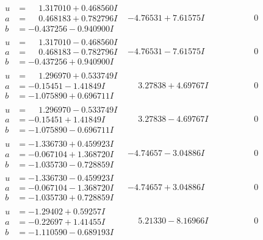 \documentclass[1p]{elsarticle_modified}
\theoremstyle{definition}
\begin{document}
$$\begin{array}{c|c|c}
\begin{aligned}
u &= \phantom{-}1.317010 + 0.468560 I \\
a &= \phantom{-}0.468183 + 0.782796 I \\
b &= -0.437256 - 0.940900 I\end{aligned}
 & -4.76531 + 7.61575 I & \phantom{-0.000000 } 0 \\ \hline\begin{aligned}
u &= \phantom{-}1.317010 - 0.468560 I \\
a &= \phantom{-}0.468183 - 0.782796 I \\
b &= -0.437256 + 0.940900 I\end{aligned}
 & -4.76531 - 7.61575 I & \phantom{-0.000000 } 0 \\ \hline\begin{aligned}
u &= \phantom{-}1.296970 + 0.533749 I \\
a &= -0.15451 - 1.41849 I \\
b &= -1.075890 + 0.696711 I\end{aligned}
 & \phantom{-}3.27838 + 4.69767 I & \phantom{-0.000000 } 0 \\ \hline\begin{aligned}
u &= \phantom{-}1.296970 - 0.533749 I \\
a &= -0.15451 + 1.41849 I \\
b &= -1.075890 - 0.696711 I\end{aligned}
 & \phantom{-}3.27838 - 4.69767 I & \phantom{-0.000000 } 0 \\ \hline\begin{aligned}
u &= -1.336730 + 0.459923 I \\
a &= -0.067104 + 1.368720 I \\
b &= -1.035730 - 0.728859 I\end{aligned}
 & -4.74657 - 3.04886 I & \phantom{-0.000000 } 0 \\ \hline\begin{aligned}
u &= -1.336730 - 0.459923 I \\
a &= -0.067104 - 1.368720 I \\
b &= -1.035730 + 0.728859 I\end{aligned}
 & -4.74657 + 3.04886 I & \phantom{-0.000000 } 0 \\ \hline\begin{aligned}
u &= -1.29402 + 0.59257 I \\
a &= -0.22697 + 1.41455 I \\
b &= -1.110590 - 0.689193 I\end{aligned}
 & \phantom{-}5.21330 - 8.16966 I & \phantom{-0.000000 } 0\\

\end{array}$$
\end{document}
